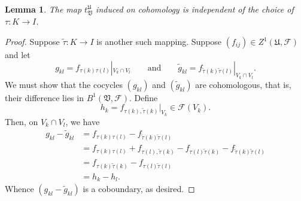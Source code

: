 \documentclass[12pt]{article}
\theoremstyle{thmstyle}
\newtheorem{lemma}[theorem]{Lemma}
\theoremstyle{defstyle}
\newcommand{\frakU}{\mathfrak{U}}
\newcommand{\frakV}{\mathfrak{V}}
\newcommand{\scrF}{\mathscr F}
\newcommand{\wt}[1]{\widetilde{#1}}
\begin{document}
\begin{lemma}
    The map $t^{\frakU}_{\frakV}$ induced on cohomology is independent of the choice of $\tau: K\to I$.
\end{lemma}
\begin{proof}
    Suppose $\wt\tau: K\to I$ is another such mapping. Suppose $(f_{ij})\in Z^1(\frakU,\scrF)$ and let 
    \begin{equation*}
        g_{kl} = f_{\tau(k)\tau(l)}|_{V_k\cap V_l}\qquad\text{and}\qquad\wt g_{kl} = f_{\wt\tau(k)\wt\tau(l)}|_{V_k\cap V_l}.
    \end{equation*}
    We must show that the cocycles $(g_{kl})$ and $(\wt g_{kl})$ are cohomologous, that is, their difference lies in $B^1(\frakV,\scrF)$. Define
    \begin{equation*}
        h_k = f_{\tau(k),\wt\tau(k)}|_{V_k}\in\scrF(V_k).
    \end{equation*}
    Then, on $V_k\cap V_l$, we have 
    \begin{align*}
        g_{kl} - \wt g_{kl} &= f_{\tau(k)\tau(l)} - f_{\wt\tau(k)\wt\tau(l)}\\
        &= f_{\tau(k)\tau(l)} + f_{\tau(l),\wt\tau(k)} - f_{\tau(l)\wt\tau(k)} - f_{\wt\tau(k)\wt\tau(l)}\\
        &= f_{\tau(k)\wt\tau(k)} - f_{\tau(l)\wt\tau(l)}\\
        &= h_k - h_l.
    \end{align*}
    Whence $(g_{kl} - \wt g_{kl})$ is a coboundary, as desired.
\end{proof}
\end{document}
